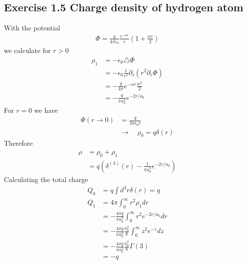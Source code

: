 \documentclass[../main.tex]{subfiles}
\begin{document}
\subsection{Exercise 1.5 Charge density of hydrogen atom}
With the potential
\begin{align}
\Phi=\frac{q}{4\pi\epsilon_0}\frac{e^{-\alpha r}}{r}\left(1+\frac{\alpha r}{2}\right)
\end{align}
we calculate for $r>0$
\begin{align}
\rho_1
&=-\epsilon_0\triangle\Phi\\
&=-\epsilon_0\frac{1}{r^2}\partial_r(r^2\partial_r\Phi)\\
&=-\frac{q}{4\pi}e^{-\alpha r}\frac{\alpha^3}{2}\\
&=-\frac{q}{\pi a_0^3}e^{-2r/a_0}
\end{align}
For $r=0$ we have
\begin{align}
\Phi(r\rightarrow0)&=\frac{q}{4\pi\epsilon_0r}\\
&\rightarrow\quad \rho_0=q\delta(r)
\end{align}
Therefore
\begin{align}
\rho&=\rho_0+\rho_1\\
&=q\left(\delta^{(3)}(r)-\frac{1}{\pi a_0^3}e^{-2r/a_0}\right)
\end{align}
Calculating the total charge
\begin{align}
Q_0&=q\int d^3r\delta(r)=q\\
Q_1
&=4\pi\int_0^\infty r^2\rho_1 dr\\
&=-\frac{4\pi q}{\pi a_0^3}\int_0^\infty r^2e^{-2r/a_0}dr\\
&=-\frac{4\pi q}{\pi a_0^3}\frac{a_0^3}{8}\int_0^\infty z^2e^{-z}dz\\
&=-\frac{4\pi q}{\pi a_0^3}\frac{a_0^3}{8}\Gamma(3)\\
&=-q
\end{align}
\end{document}
